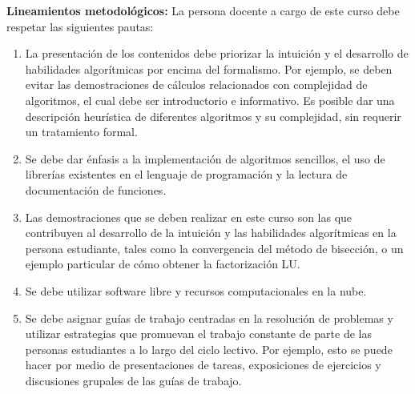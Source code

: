 \begin{refsection}
\noindent \textbf{Lineamientos metodológicos:} La persona docente a cargo de este curso debe respetar las siguientes pautas:
\begin{enumerate}
    \item La presentación de los contenidos debe priorizar la intuición y el desarrollo de habilidades algorítmicas por encima del formalismo. Por ejemplo, se deben evitar las demostraciones de cálculos relacionados con complejidad de algoritmos, el cual debe ser introductorio e informativo. Es posible dar una descripción heurística de diferentes algoritmos y su complejidad, sin requerir un tratamiento formal.
    \item Se debe dar énfasis a la implementación de algoritmos sencillos, el uso de librerías existentes en el lenguaje de programación y la lectura de documentación de funciones.
    \item Las demostraciones que se deben realizar en este curso son las que contribuyen al desarrollo de la intuición y las habilidades algorítmicas en la persona estudiante, tales como la convergencia del método de bisección, o un ejemplo particular de cómo obtener la factorización LU.
    \item Se debe utilizar software libre y recursos computacionales en la nube.%
    \item Se debe asignar guías de trabajo centradas en la resolución de problemas y utilizar estrategias  que promuevan el trabajo constante de parte de las personas estudiantes a lo largo del ciclo lectivo. Por ejemplo, esto se puede hacer por medio de presentaciones de tareas, exposiciones de ejercicios y discusiones grupales de las guías de trabajo.
\end{enumerate}


\end{refsection}
